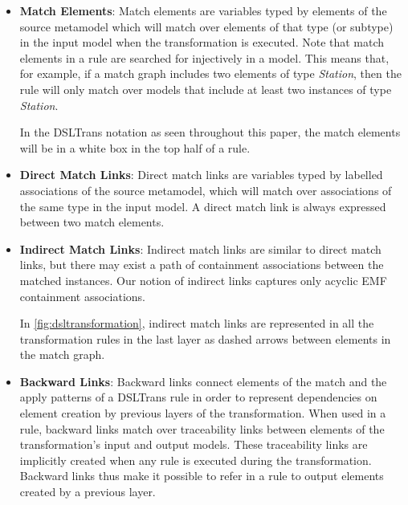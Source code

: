 \begin{itemize}
\item \textbf{Match Elements}: Match elements are variables typed by elements of the source
metamodel which will match over elements of that type (or subtype) in the
input model when the transformation is executed. Note that match
elements in a rule are searched for injectively in a model. This means that, for
example, if a match graph includes two elements of type \emph{Station}, then the rule will only match over models that include at least two instances of type \emph{Station}.

In the DSLTrans notation as seen throughout this paper, the match elements will be in a white box in the top half of a rule.\\

\item \textbf{Direct Match Links}: Direct match links are variables typed by labelled associations of the source metamodel, which will match over associations of the same type in the input model. A direct match link is always expressed between two match elements.\\

\item \textbf{Indirect Match Links}: Indirect match links are similar to direct
match links, but there may exist a path of containment associations between the
matched instances. Our notion of indirect links captures only
acyclic EMF containment associations.


In \cref{fig:dsltransformation}, indirect match links are represented in all the
transformation rules in the last layer as dashed arrows between elements in the match graph.\\

\item \textbf{Backward Links}: Backward links connect elements of the match and
the apply patterns of a DSLTrans rule in order to represent dependencies on
element creation by previous layers of the transformation. When used in a rule,
backward links match over traceability links between elements of the
transformation's input and output models.
These traceability links are implicitly created when any rule is executed during the transformation. Backward
links thus make it possible to refer in a rule to output elements created by a
previous layer.


\end{itemize}
